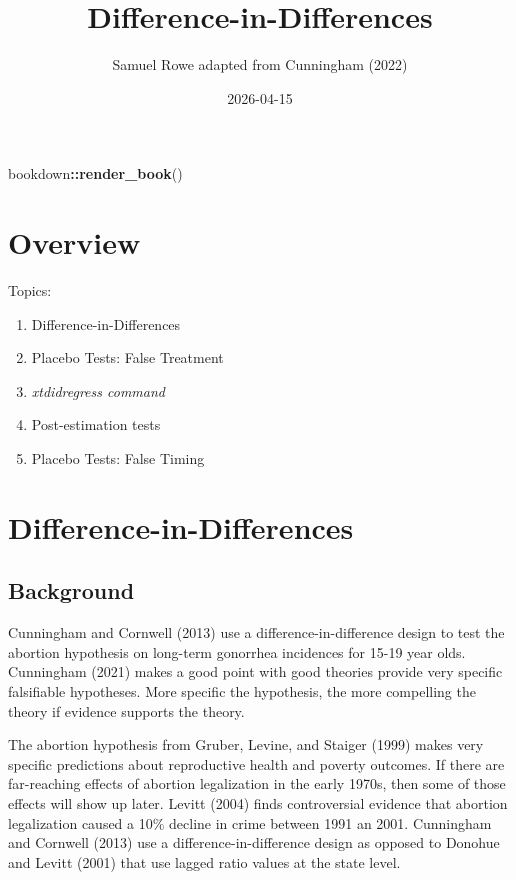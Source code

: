 \documentclass[
]{book}
\title{Difference-in-Differences}
\author{Samuel Rowe adapted from Cunningham (2022)}
\date{2026-04-15}
\newenvironment{Shaded}{\begin{snugshade}}{\end{snugshade}}
\newcommand{\FunctionTok}[1]{\textcolor[rgb]{0.13,0.29,0.53}{\textbf{#1}}}
\newcommand{\NormalTok}[1]{#1}
\newcommand{\SpecialCharTok}[1]{\textcolor[rgb]{0.81,0.36,0.00}{\textbf{#1}}}
\providecommand{\tightlist}{%
  \setlength{\itemsep}{0pt}\setlength{\parskip}{0pt}}
\begin{document}
\maketitle

{
\setcounter{tocdepth}{1}
\tableofcontents
}
\begin{Shaded}
\begin{Highlighting}[]
\NormalTok{bookdown}\SpecialCharTok{::}\FunctionTok{render\_book}\NormalTok{()}
\end{Highlighting}
\end{Shaded}

\chapter*{Overview}\label{overview}

Topics:

\begin{enumerate}
\def\labelenumi{\arabic{enumi}.}
\tightlist
\item
  Difference-in-Differences
\item
  Placebo Tests: False Treatment
\item
  \emph{xtdidregress command}
\item
  Post-estimation tests
\item
  Placebo Tests: False Timing
\end{enumerate}

\chapter{Difference-in-Differences}\label{difference-in-differences}

\section{Background}\label{background}

Cunningham and Cornwell (2013) use a difference-in-difference design to test the abortion hypothesis on long-term gonorrhea incidences for 15-19 year olds. Cunningham (2021) makes a good point with good theories provide very specific falsifiable hypotheses. More specific the hypothesis, the more compelling the theory if evidence supports the theory.

The abortion hypothesis from Gruber, Levine, and Staiger (1999) makes very specific predictions about reproductive health and poverty outcomes. If there are far-reaching effects of abortion legalization in the early 1970s, then some of those effects will show up later. Levitt (2004) finds controversial evidence that abortion legalization caused a 10\% decline in crime between 1991 an 2001. Cunningham and Cornwell (2013) use a difference-in-difference design as opposed to Donohue and Levitt (2001) that use lagged ratio values at the state level.
\end{document}
